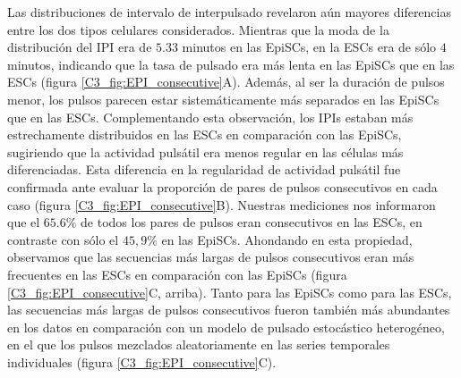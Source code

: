 \documentclass[./main.tex]{subfiles}
\begin{document}
Las distribuciones de intervalo de interpulsado revelaron aún mayores diferencias entre los dos tipos celulares considerados. Mientras que la moda de la distribución del IPI era de $5.33$ minutos en las EpiSCs, en la ESCs era de sólo $4$ minutos, indicando que la tasa de pulsado era más lenta en las EpiSCs que en las ESCs (figura \ref{C3_fig:EPI_consecutive}A). Además, al ser la duración de pulsos menor, los pulsos parecen estar sistemáticamente más separados en las EpiSCs que en las ESCs. Complementando esta observación, los IPIs estaban más estrechamente distribuidos en las ESCs en comparación con las EpiSCs, sugiriendo que la actividad pulsátil era menos regular en las células más diferenciadas. Esta diferencia en la regularidad de actividad pulsátil fue confirmada ante evaluar la proporción de pares de pulsos consecutivos en cada caso (figura \ref{C3_fig:EPI_consecutive}B). Nuestras mediciones nos informaron que el $65.6\%$ de todos los pares de pulsos eran consecutivos en las ESCs, en contraste con sólo el $45,9\%$ en las EpiSCs. Ahondando en esta propiedad, observamos que las secuencias más largas de pulsos consecutivos eran más frecuentes en las ESCs en comparación con las EpiSCs (figura \ref{C3_fig:EPI_consecutive}C, arriba). Tanto para las EpiSCs como para las ESCs, las secuencias más largas de pulsos consecutivos fueron también más abundantes en los datos en comparación con un modelo de pulsado estocástico heterogéneo, en el que los pulsos mezclados aleatoriamente en las series temporales individuales (figura \ref{C3_fig:EPI_consecutive}C). 
\end{document}

